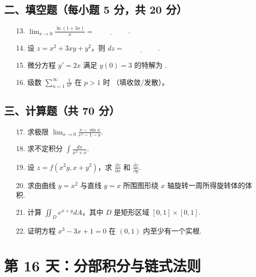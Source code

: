 \documentclass[11pt,a4paper]{article}
\begin{document}
\subsection*{二、填空题（每小题 5 分，共 20 分）}
\begin{enumerate}
    \item[13.] $\lim_{x \to 0} \frac{\ln(1+3x)}{x} = \underline{\hspace{2cm}}$.
    \item[14.] 设 $z = x^2 + 3xy + y^2$，则 $dz = \underline{\hspace{2cm}}$.
    \item[15.] 微分方程 $y' = 2x$ 满足 $y(0)=3$ 的特解为 \underline{\hspace{2cm}}.
    \item[16.] 级数 $\sum_{n=1}^{\infty} \frac{1}{n^p}$ 在 $p > 1$ 时 \underline{\hspace{2cm}}（填收敛/发散）。
\end{enumerate}
\subsection*{三、计算题（共 70 分）}
\begin{enumerate}
    \item[17.] 求极限 $\lim_{x \to 0} \frac{x - \sin x}{e^x - 1 - x}$.
    \item[18.] 求不定积分 $\int \frac{dx}{x^2+x}$.
    \item[19.] 设 $z = f(x^2y, x+y^2)$，求 $\frac{\partial z}{\partial x}$ 和 $\frac{\partial z}{\partial y}$.
    \item[20.] 求由曲线 $y=x^2$ 与直线 $y=x$ 所围图形绕 $x$ 轴旋转一周所得旋转体的体积.
    \item[21.] 计算 $\iint_D e^{x+y} dA$，其中 $D$ 是矩形区域 $[0, 1] \times [0, 1]$.
    \item[22.] 证明方程 $x^3 - 3x + 1 = 0$ 在 $(0, 1)$ 内至少有一个实根.
\end{enumerate}

\newpage

\section*{第 16 天：分部积分与链式法则}
\end{document}
